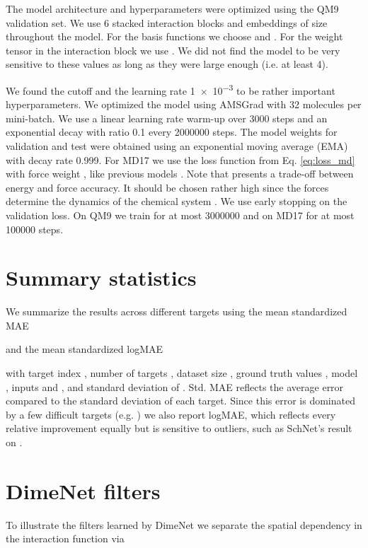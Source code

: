 \documentclass{article} \usepackage{iclr2020_conference,times}
\begin{document}
The model architecture and hyperparameters were optimized using the QM9 validation set. We use 6 stacked interaction blocks and embeddings of size  throughout the model. For the basis functions we choose  and . For the weight tensor in the interaction block we use . We did not find the model to be very sensitive to these values as long as they were large enough (i.e. at least 4).

We found the cutoff  and the learning rate \num{1e-3} to be rather important hyperparameters. We optimized the model using AMSGrad \citep{reddi_convergence_2018} with 32 molecules per mini-batch. We use a linear learning rate warm-up over \num{3000} steps and an exponential decay with ratio \num{0.1} every \num{2000000} steps. The model weights for validation and test were obtained using an exponential moving average (EMA) with decay rate \num{0.999}. For MD17 we use the loss function from Eq. \ref{eq:loss_md} with force weight , like previous models \citet{schutt_schnet:_2017}. Note that  presents a trade-off between energy and force accuracy. It should be chosen rather high since the forces determine the dynamics of the chemical system \citep{unke_physnet:_2019}. We use early stopping on the validation loss. On QM9 we train for at most \num{3000000} and on MD17 for at most \num{100000} steps.

\section{Summary statistics} \label{app:sum}

We summarize the results across different targets using the mean standardized MAE

and the mean standardized logMAE

with target index , number of targets , dataset size , ground truth values , model , inputs  and , and standard deviation  of . Std. MAE reflects the average error compared to the standard deviation of each target. Since this error is dominated by a few difficult targets (e.g. ) we also report logMAE, which reflects every relative improvement equally but is sensitive to outliers, such as SchNet's result on .

\section{DimeNet filters} \label{app:filters}

To illustrate the filters learned by DimeNet we separate the spatial dependency in the interaction function  via
\end{document}
